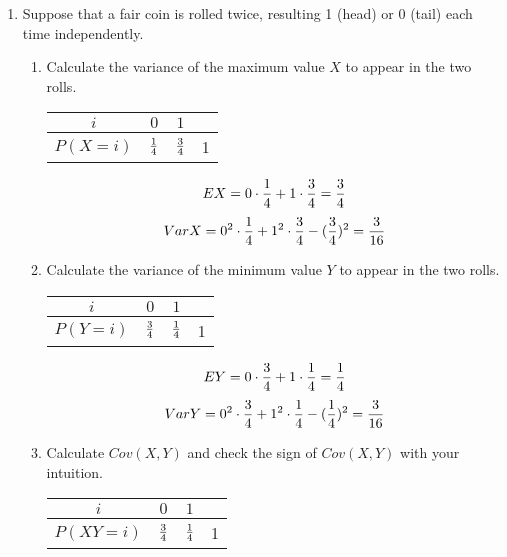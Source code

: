 \documentclass[12pt]{article}%
\newcommand{\0}{{\bf 0}}
\begin{document}
\begin{enumerate}
\item 
Suppose that a fair coin is rolled twice, resulting 1 (head) or 0 (tail) each time independently. 
\begin{enumerate}
\item Calculate the variance of the maximum value $X$ to appear in the two rolls.
\\
{\color{blue}{\bf Sol.}}
\begin{table}[H]    \center
\begin{tabular}{|c||c|c||c|} \hline
           $i$        &   $0$      &   $1$   & \\
\hline 
$P(X=i)$    & $\frac{1}{4}$  & $\frac{3}{4}$& 1\\
\hline

\end{tabular}\vspace{3mm}
\end{table}
$$EX=0\cdot\frac{1}{4}+1\cdot\frac{3}{4}=\frac{3}{4}$$
$$VarX=0^2\cdot\frac{1}{4}+1^2\cdot\frac{3}{4}-(\frac{3}{4})^2=\frac{3}{16}$$
\item Calculate the variance of the minimum value $Y$ to appear in the two rolls.
\\
{\color{blue}{\bf Sol.}}
\begin{table}[H]    \center
\begin{tabular}{|c||c|c||c|} \hline
           $i$        &   $0$      &   $1$   & \\
\hline 
$P(Y=i)$    & $\frac{3}{4}$  & $\frac{1}{4}$& 1\\
\hline

\end{tabular}\vspace{3mm}
\end{table}
$$EY=0\cdot\frac{3}{4}+1\cdot\frac{1}{4}=\frac{1}{4}$$
$$VarY=0^2\cdot\frac{3}{4}+1^2\cdot\frac{1}{4}-(\frac{1}{4})^2=\frac{3}{16}$$
\item Calculate $Cov(X,Y)$ and check the sign of $Cov(X,Y)$ with your intuition.
\\
{\color{blue}{\bf Sol.}}
\begin{table}[H]    \center
\begin{tabular}{|c||c|c||c|} \hline
           $i$        &   $0$      &   $1$   & \\
\hline 
$P(XY=i)$    & $\frac{3}{4}$  & $\frac{1}{4}$& 1\\
\hline


\end{tabular}
\end{table}
\end{enumerate}
\end{enumerate}
\end{document}
